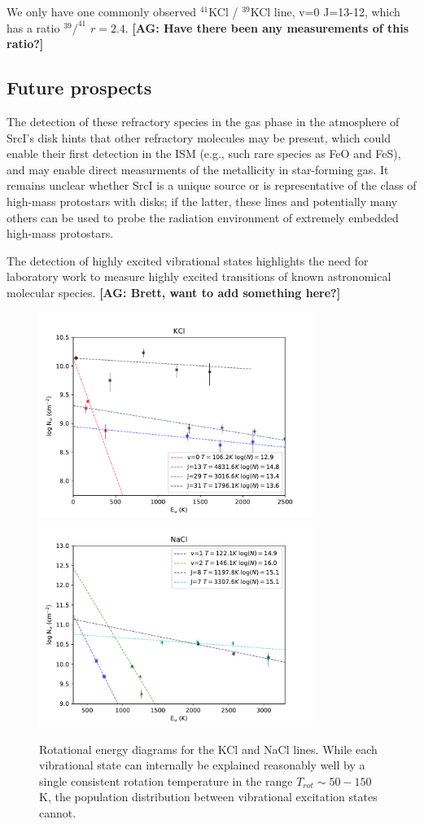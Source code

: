 \documentclass[twocolumn]{aastex62}
\newcommand{\sourcei}{SrcI\xspace}
\newcommand{\ag}[1]{\textcolor{red!65!black}{\textbf{[AG: #1]}}}
\begin{document}
We only have one commonly observed $^{41}$KCl / $^{39}$KCl line, v=0 J=13-12,
which has a ratio $^{39}/^{41}$ $r=2.4$.  \ag{Have there been any measurements
of this ratio?}


\subsection{Future prospects}
The detection of these refractory species in the gas phase in the atmosphere
of \sourcei's disk hints that other refractory molecules may be present, 
which could enable their first detection in the ISM (e.g., such rare species as
FeO and FeS), and may enable direct measurments of the metallicity in
star-forming gas.
It remains unclear whether \sourcei is a unique source or is representative
of the class of high-mass protostars with disks; if the latter, these lines
and potentially many others can be used to probe the radiation environment of 
extremely embedded high-mass protostars.  

The detection of highly excited vibrational states highlights the need for
laboratory work to measure highly excited transitions of known astronomical
molecular species.  \ag{Brett, want to add something here?}

\begin{figure}[!htp]
\includegraphics[scale=1,width=3.5in]{figures/KCl_rotational_diagrams.pdf}
\includegraphics[scale=1,width=3.5in]{figures/NaCl_rotational_diagrams.pdf}
\caption{Rotational energy diagrams for the KCl and NaCl lines.  While each
vibrational state can internally be explained reasonably well by a single
consistent rotation temperature in the range $T_{rot}\sim50-150$ K, the population
distribution between vibrational excitation states cannot.}
\label{fig:rotationdiagrams}
\end{figure}
\end{document}
